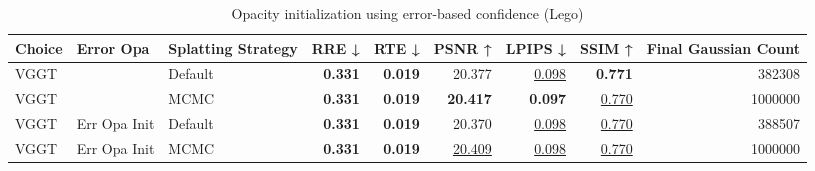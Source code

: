\begin{table}[H]
\caption{Opacity initialization using error-based confidence (Lego)}
\label{tab:05_error_opa_lego}
\begin{tabular}{lllrrrrrr}
\toprule
Choice & Error Opa & Splatting Strategy & RRE ↓ & RTE ↓ & PSNR ↑ & LPIPS ↓ & SSIM ↑ & Final Gaussian Count \\
\midrule
VGGT &  & Default & \textbf{0.331} & \textbf{0.019} & 20.377 & \underline{0.098} & \textbf{0.771} & 382308 \\
VGGT &  & MCMC & \textbf{0.331} & \textbf{0.019} & \textbf{20.417} & \textbf{0.097} & \underline{0.770} & 1000000 \\
VGGT & Err Opa Init & Default & \textbf{0.331} & \textbf{0.019} & 20.370 & \underline{0.098} & \underline{0.770} & 388507 \\
VGGT & Err Opa Init & MCMC & \textbf{0.331} & \textbf{0.019} & \underline{20.409} & \underline{0.098} & \underline{0.770} & 1000000 \\
\bottomrule
\end{tabular}
\end{table}
